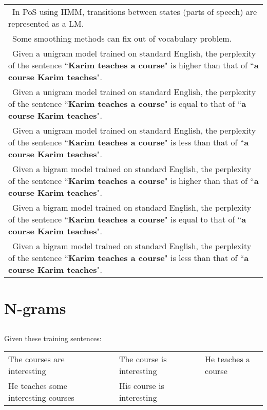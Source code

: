 \documentclass[11pt, a4paper]{article}
\begin{document}
\begin{longtable}{|p{}|}
	\hline 
	\Square\ In PoS using HMM, transitions between states (parts of speech) are represented as a LM. \\
	\Square\ Some smoothing methods can fix out of vocabulary problem. \\
	\Square\ Given a unigram model trained on standard English, the perplexity of the sentence ``\textbf{Karim teaches a course}" is higher than that of ``\textbf{a course Karim teaches}". \\
	\Square\ Given a unigram model trained on standard English, the perplexity of the sentence ``\textbf{Karim teaches a course}" is equal to that of ``\textbf{a course Karim teaches}".\\
	\Square\ Given a unigram model trained on standard English, the perplexity of the sentence ``\textbf{Karim teaches a course}" is less than that of ``\textbf{a course Karim teaches}".\\
	\Square\ Given a bigram model trained on standard English, the perplexity of the sentence ``\textbf{Karim teaches a course}" is higher than that of ``\textbf{a course Karim teaches}". \\
	\Square\ Given a bigram model trained on standard English, the perplexity of the sentence ``\textbf{Karim teaches a course}" is equal to that of ``\textbf{a course Karim teaches}".\\
	\Square\ Given a bigram model trained on standard English, the perplexity of the sentence ``\textbf{Karim teaches a course}" is less than that of ``\textbf{a course Karim teaches}".\\
	\hline
\end{longtable}

\section{N-grams}

\subsection{}

Given these training sentences: 

\begin{tabular}{|lllll|}
	\hline
	The courses are interesting && The course is interesting && He teaches a course \\
	He teaches some interesting courses && His course is interesting &&\\
	\hline
\end{tabular}
\end{document}
